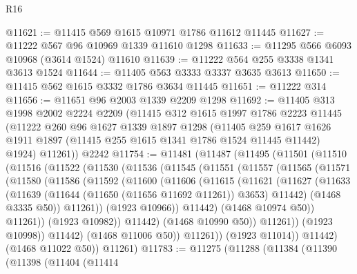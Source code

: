 \begin{lexlean}{R16}
\begin{coremodule}
@11621 := @11415 @569 @1615 @10971 @1786 @11612 @11445
@11627 := @11222 @567 @96 @10969 @1339 @11610 @1298
@11633 := @11295 @566 @6093 @10968 (@3614 @1524) @11610
@11639 := @11222 @564 @255 @3338 @1341 @3613 @1524
@11644 := @11405 @563 @3333 @3337 @3635 @3613
@11650 := @11415 @562 @1615 @3332 @1786 @3634 @11445
@11651 := @11222 @314
@11656 := @11651 @96 @2003 @1339 @2209 @1298
@11692 := @11405
    @313
    @1998
    @2002
    @2224
    @2209
    (@11415
      @312
      @1615
      @1997
      @1786
      @2223
      @11445
      (@11222
        @260
        @96
        @1627
        @1339
        @1897
        @1298
        (@11405
          @259
          @1617
          @1626
          @1911
          @1897
          (@11415 @255 @1615 @1341 @1786 @1524 @11445 @11442)
          @1924)
        @11261))
    @2242
@11754 := @11481
    (@11487
      (@11495
        (@11501
          (@11510
            (@11516
              (@11522
                (@11530
                  (@11536
                    (@11545
                      (@11551
                        (@11557
                          (@11565
                            (@11571
                              (@11580
                                (@11586
                                  (@11592
                                    (@11600
                                      (@11606
                                        (@11615
                                          (@11621
                                            (@11627
                                              (@11633
                                                (@11639
                                                  (@11644 (@11650 (@11656 @11692 @11261)) @3653)
                                                  @11442)
                                                (@1468 @3335 @50))
                                              @11261))
                                          (@1923 @10966))
                                        @11442)
                                      (@1468 @10974 @50))
                                    @11261))
                                (@1923 @10982))
                              @11442)
                            (@1468 @10990 @50))
                          @11261))
                      (@1923 @10998))
                    @11442)
                  (@1468 @11006 @50))
                @11261))
            (@1923 @11014))
          @11442)
        (@1468 @11022 @50))
      @11261)
@11783 := @11275
    (@11288
      (@11384
        (@11390
          (@11398
            (@11404
              (@11414

\end{coremodule}
\end{lexlean}
